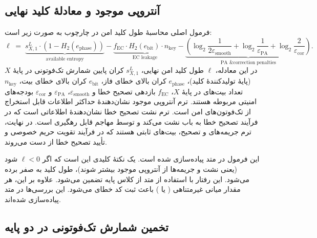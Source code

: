 \subsection{آنتروپی موجود و معادلۀ کلید نهایی}

فرمول اصلی محاسبۀ طول کلید امن در چارچوب  به صورت زیر است:
\begin{equation}
	\ell \;=\; \underbrace{s_{X,1}^L \cdot \left(1 - H_2(e_{\text{phase}})\right)}_{\text{available entropy}} - \underbrace{f_{\text{EC}} \cdot H_2(e_{\text{bit}}) \cdot n_{\text{key}}}_{\text{EC leakage}} - \underbrace{\left(\log_2\frac{1}{2\varepsilon_{\text{smooth}}} + \log_2\frac{1}{\varepsilon_{\text{PA}}} + \log_2\frac{2}{\varepsilon_{\text{cor}}}\right)}_{\text{PA \& correction penalties}}.
\end{equation}
در این معادله، $\ell$ طول کلید امن نهایی، $s_{X,1}^L$ کران پایین شمارش تک‌فوتونی در پایۀ $X$ (پایۀ تولیدکنندۀ کلید)، $e_{\text{phase}}$ کران بالای خطای فاز، $e_{\text{bit}}$ کران بالای خطای بیت، $n_{\text{key}}$ تعداد بیت‌های  در پایۀ $X$، $f_{\text{EC}}$ بازدهی تصحیح خطا و $\varepsilon_{\text{smooth}}$، $\varepsilon_{\text{PA}}$ و $\varepsilon_{\text{cor}}$ بودجه‌های امنیتی مربوطه هستند. ترم آنتروپی موجود نشان‌دهندۀ حداکثر اطلاعات قابل استخراج از تک‌فوتون‌های امن است. ترم نشت تصحیح خطا نشان‌دهندۀ اطلاعاتی است که در فرآیند تصحیح خطا به باب نشت می‌کند و توسط مهاجم قابل رهگیری است. در نهایت، ترم جریمه‌های  و تصحیح، بیت‌های ثابتی هستند که در فرآیند تقویت حریم خصوصی و تأیید تصحیح خطا از دست می‌روند.

این فرمول در متد  پیاده‌سازی شده است. یک نکتۀ کلیدی این است که اگر $\ell < 0$ شود (یعنی نشت و جریمه‌ها از آنتروپی موجود بیشتر شوند)، طول کلید به صفر برده می‌شود. این رفتار با استفاده از متد  از کلاس پایه تضمین می‌شود. علاوه بر این، هر مقدار میانی غیرمتناهی ( یا ) باعث ثبت کد خطای  می‌شود. این بررسی‌ها در متد  پیاده‌سازی شده‌اند.

\subsection{تخمین شمارش تک‌فوتونی در دو پایه}

